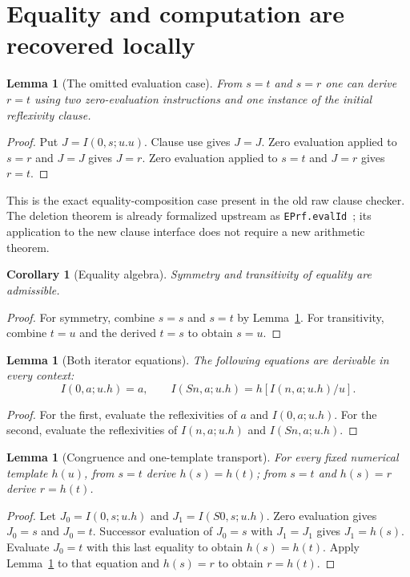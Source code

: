 \documentclass[11pt,letterpaper]{article}
\newtheorem{lemma}[theorem]{Lemma}
\newtheorem{corollary}[theorem]{Corollary}
\theoremstyle{definition}\newtheorem{definition}[theorem]{Definition}
\begin{document}
\section{Equality and computation are recovered locally}

\begin{lemma}[The omitted evaluation case]
\label{lem:composition}
From $s=t$ and $s=r$ one can derive $r=t$ using two zero-evaluation
instructions and one instance of the initial reflexivity clause.
\end{lemma}
\begin{proof}
Put $J=I(0,s;u.u)$. Clause use gives $J=J$. Zero evaluation applied to
$s=r$ and $J=J$ gives $J=r$. Zero evaluation applied to $s=t$ and
$J=r$ gives $r=t$.
\end{proof}

This is the exact equality-composition case present in the old raw
clause checker. The deletion theorem is already formalized upstream as
\texttt{EPrf.evalId}~\cite{eval}; its application to the new clause
interface does not require a new arithmetic theorem.

\begin{corollary}[Equality algebra]
Symmetry and transitivity of equality are admissible.
\end{corollary}
\begin{proof}
For symmetry, combine $s=s$ and $s=t$ by
Lemma~\ref{lem:composition}. For transitivity, combine $t=u$ and the
derived $t=s$ to obtain $s=u$.
\end{proof}

\begin{lemma}[Both iterator equations]
The following equations are derivable in every context:
\[
 I(0,a;u.h)=a,\qquad I(Sn,a;u.h)=h[I(n,a;u.h)/u].
\]
\end{lemma}
\begin{proof}
For the first, evaluate the reflexivities of $a$ and $I(0,a;u.h)$.
For the second, evaluate the reflexivities of $I(n,a;u.h)$ and
$I(Sn,a;u.h)$.
\end{proof}

\begin{lemma}[Congruence and one-template transport]
For every fixed numerical template $h(u)$, from $s=t$ derive
$h(s)=h(t)$; from $s=t$ and $h(s)=r$ derive $r=h(t)$.
\end{lemma}
\begin{proof}
Let $J_0=I(0,s;u.h)$ and $J_1=I(S0,s;u.h)$. Zero evaluation gives
$J_0=s$ and $J_0=t$. Successor evaluation of $J_0=s$ with
$J_1=J_1$ gives $J_1=h(s)$. Evaluate $J_0=t$ with this last equality
to obtain $h(s)=h(t)$. Apply Lemma~\ref{lem:composition} to that
equation and $h(s)=r$ to obtain $r=h(t)$.
\end{proof}
\end{document}
